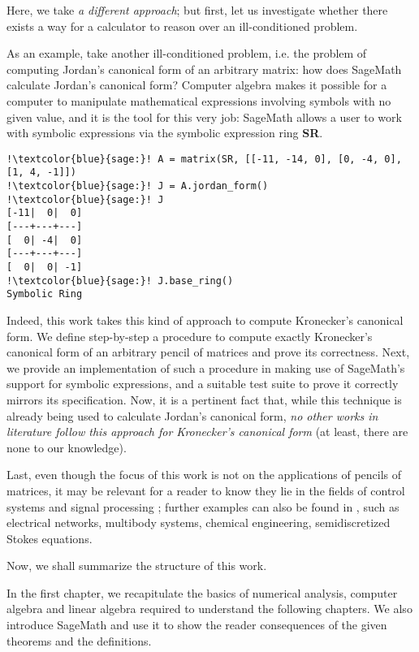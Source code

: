 Here, we take \textit{a different approach}; but first, let us investigate whether there exists a way for a
calculator to reason over an ill-conditioned problem.

As an example, take another ill-conditioned problem, i.e. the problem of computing Jordan's canonical form of
an arbitrary matrix: how does SageMath calculate Jordan's canonical form? Computer algebra makes it possible for
a computer to manipulate mathematical expressions involving symbols with no given value, and it is the tool for
this very job: SageMath allows a user to work with symbolic expressions via the symbolic expression ring \textbf{SR}.
\begin{verbatim}
!\textcolor{blue}{sage:}! A = matrix(SR, [[-11, -14, 0], [0, -4, 0], [1, 4, -1]])
!\textcolor{blue}{sage:}! J = A.jordan_form()
!\textcolor{blue}{sage:}! J
[-11|  0|  0]
[---+---+---]
[  0| -4|  0]
[---+---+---]
[  0|  0| -1]
!\textcolor{blue}{sage:}! J.base_ring()
Symbolic Ring
\end{verbatim}

Indeed, this work takes this kind of approach to compute Kronecker's canonical form. We define step-by-step a
procedure to compute exactly Kronecker's canonical form of an arbitrary pencil of matrices and prove its
correctness. Next, we provide an implementation of such a procedure in \cite{trapani-kronecker} making use of
SageMath's support for symbolic expressions, and a suitable test suite to prove it correctly mirrors its
specification. Now, it is a pertinent fact that, while this technique is already being used to calculate
Jordan's canonical form, \textit{no other works in literature follow this approach for Kronecker's canonical form}
(at least, there are none to our knowledge).

Last, even though the focus of this work is not on the applications of pencils of matrices, it may be relevant
for a reader to know they lie in the fields of control
systems \cite{824690, 1103983} and signal processing \cite{1179782}; further examples can also be found in
\cite[pp. 8-11]{kunkel-mehrmann}, such as electrical networks, multibody systems, chemical
engineering, semidiscretized Stokes equations.

\vspace{5mm}

Now, we shall summarize the structure of this work.

In the first chapter, we recapitulate the basics of numerical analysis, computer algebra and linear algebra required to
understand the following chapters. We also introduce SageMath and use it to show the reader consequences of the given
theorems and the definitions.

